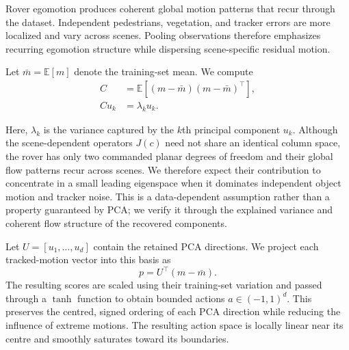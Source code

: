 \documentclass[letterpaper]{article} %
\begin{document}
Rover egomotion produces coherent global motion patterns that recur
through the dataset. Independent pedestrians, vegetation, and tracker
errors are more localized and vary across scenes. Pooling observations
therefore emphasizes recurring egomotion structure while dispersing
scene-specific residual motion.

Let $\bar m=\mathbb{E}[m]$ denote the training-set mean. We compute
\begin{equation}
    \begin{aligned}
        C
        &=
        \mathbb{E}
        \left[
            (m-\bar m)(m-\bar m)^\top
        \right],\\
        C u_k
        &=
        \lambda_k u_k.
    \end{aligned}
    \label{eq:motion_pca}
\end{equation}

Here, $\lambda_k$ is the variance captured by the $k$th principal component
$u_k$. Although the scene-dependent operators $J(c)$ need not share an identical
column space, the rover has only two commanded planar degrees of freedom and
their global flow patterns recur across scenes. We therefore expect their
contribution to concentrate in a small leading eigenspace when it dominates
independent object motion and tracker noise. This is a data-dependent
assumption rather than a property guaranteed by PCA; we verify it through
the explained variance and coherent flow structure of the recovered
components.

Let $U=[u_1,\ldots,u_d]$ contain the retained PCA directions. We project each
tracked-motion vector into this basis as
\begin{equation}
    p = U^\top(m-\bar m).
    \label{eq:pca_projection}
\end{equation}
The resulting scores are scaled using their training-set variation and passed
through a $\tanh$ function to obtain bounded actions $a\in(-1,1)^d$. This
preserves the centred, signed ordering of each PCA direction while reducing
the influence of extreme motions. The resulting action space is locally
linear near its centre and smoothly saturates toward its boundaries.
\end{document}
